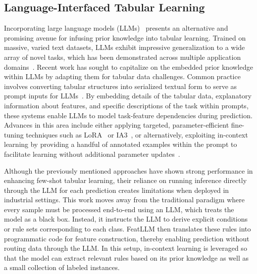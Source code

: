 \subsection{Language-Interfaced Tabular Learning}

Incorporating large language models (LLMs)~\cite{anil2023palm,openai2023gpt4} presents an alternative and promising avenue for infusing prior knowledge into tabular learning. Trained on massive, varied text datasets, LLMs exhibit impressive generalization to a wide array of novel tasks, which has been demonstrated across multiple application domains~\cite{brown2020language}. Recent work has sought to capitalize on the embedded prior knowledge within LLMs by adapting them for tabular data challenges. Common practice involves converting tabular structures into serialized textual form to serve as prompt inputs for LLMs~\cite{dinh2022lift,hegselmann2023tabllm,wang2023anypredict}. By embedding details of the tabular data, explanatory information about features, and specific descriptions of the task within prompts, these systems enable LLMs to model task-feature dependencies during prediction. Advances in this area include either applying targeted, parameter-efficient fine-tuning techniques such as LoRA~\cite{hu2021lora} or IA3~\cite{liu2022few}, or alternatively, exploiting in-context learning by providing a handful of annotated examples within the prompt to facilitate learning without additional parameter updates~\cite{dinh2022lift,hegselmann2023tabllm,nam2023semi,slack2023tablet}.

Although the previously mentioned approaches have shown strong performance in enhancing few-shot tabular learning, their reliance on running inference directly through the LLM for each prediction creates limitations when deployed in industrial settings. This work moves away from the traditional paradigm where every sample must be processed end-to-end using an LLM, which treats the model as a black box. Instead, it instructs the LLM to derive explicit conditions or rule sets corresponding to each class. \textsf{FeatLLM} then translates these rules into programmatic code for feature construction, thereby enabling prediction without routing data through the LLM. In this setup, in-context learning is leveraged so that the model can extract relevant rules based on its prior knowledge as well as a small collection of labeled instances.

